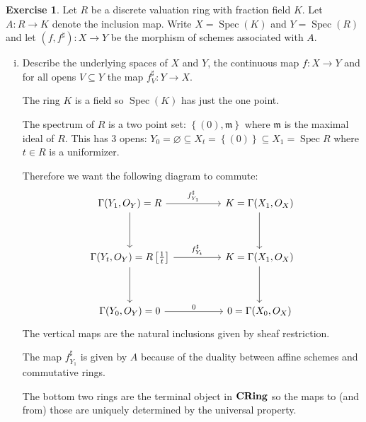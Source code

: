 \documentclass{article}
\newcommand{\maxid}{\mathfrak{m}}
\newcommand{\cring}{{\bf CRing}}
\newcommand{\set}[1]{\left\{#1\right\}}
\DeclareMathOperator{\spec}{Spec}
\theoremstyle{definition}
\newtheorem{question}{Exercise}
\begin{document}
\begin{question}
    Let \(R\) be a discrete valuation ring with fraction field \(K\). Let
    \(A:R\to K\) denote the inclusion map. Write \(X=\spec(K)\) and
    \(Y=\spec(R)\) and let \((f,f^{\sharp}):X\to Y\) be the morphism of schemes
    associated with \(A\).

    \begin{enumerate}[(i)]
        \item Describe the underlying spaces of \(X\) and \(Y\), the continuous
              map \(f:X\to Y\) and for all opens \(V\subseteq Y\) the map
              \(f^{\sharp}_{V}:Y\to X\).

              The ring \(K\) is a field so \(\spec(K)\) has just the one point.

              The spectrum of \(R\) is a two point set: \(\set{(0),\maxid}\)
              where \(\maxid\) is the maximal ideal of \(R\). This has 3 opens:
              \(Y_{0}=\varnothing\subseteq X_{t}=\set{(0)}\subseteq X_{1}=\spec
              R\) where \(t\in R\) is a uniformizer.

              Therefore we want the following diagram to commute:
              \[
                  \begin{tikzcd}[ampersand replacement=\&]
                      {\Gamma(Y_{1},O_{Y})=R} \&\& {K=\Gamma(X_{1},O_{X})} \\
                      \\
                      {\Gamma(Y_{t},O_{Y})=R\left[\frac{1}{t}\right]} \&\& {K=\Gamma(X_{1},O_{X})} \\
                      \\
                      {\Gamma(Y_{0},O_{Y})=0} \&\& {0=\Gamma(X_{0},O_{X})}
                      \arrow["0", from=5-1, to=5-3]
                      \arrow[from=3-1, to=5-1]
                      \arrow[from=1-1, to=3-1]
                      \arrow[from=1-3, to=3-3]
                      \arrow[from=3-3, to=5-3]
                      \arrow["{f^{\sharp}_{Y_{1}}}", from=1-1, to=1-3]
                      \arrow["{f^{\sharp}_{Y_{t}}}", from=3-1, to=3-3]
                  \end{tikzcd}
              \]
              The vertical maps are the natural inclusions given by sheaf
              restriction.

              The map \(f^{\sharp}_{Y_{1}}\) is given by \(A\) because of the
              duality between affine schemes and commutative rings.

              The bottom two rings are the terminal object in \(\cring\) so
              the maps to (and from) those are uniquely determined by the
              universal property.


\end{enumerate}
\end{question}
\end{document}
